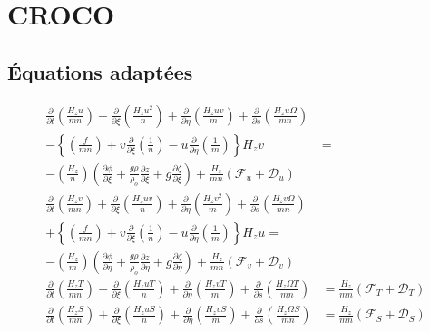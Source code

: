 \chapter{CROCO}
\section{Équations adaptées}
\label{sec:eq adapte}
\begin{subequations}
    \begin{align}
        \frac{\partial}{\partial t}\left(\frac{H_{z} u}{m n}\right)+\frac{\partial}{\partial \xi}\left(\frac{H_{z} u^{2}}{n}\right) + \frac{\partial}{\partial \eta}\left(\frac{H_{z} u v}{m}\right) + \frac{\partial}{\partial s}\left(\frac{H_{z} u \Omega}{m n}\right)  \nonumber \\
        - \left\{\left(\frac{f}{m n}\right) + v \frac{\partial}{\partial \xi}\left(\frac{1}{n}\right) - u \frac{\partial}{\partial \eta}\left(\frac{1}{m}\right)\right\} H_{z} v & = \nonumber \\
        -\left(\frac{H_{z}}{n}\right)\left(\frac{\partial \phi}{\partial \xi}+\frac{g \rho}{\rho_{o}} \frac{\partial z}{\partial \xi}+g \frac{\partial \zeta}{\partial \xi}\right)+\frac{H_{z}}{m n}\left(\mathcal{F}_{u}+\mathcal{D}_{u}\right) \\
        \frac{\partial}{\partial t}\left(\frac{H_{z} v}{m n}\right)+\frac{\partial}{\partial \xi}\left(\frac{H_{z} u v}{n}\right)+\frac{\partial}{\partial \eta}\left(\frac{H_{z} v^{2}}{m}\right)+\frac{\partial}{\partial s}\left(\frac{H_{z} v \Omega}{m n}\right)  \nonumber \\
        + \left\{\left(\frac{f}{m n}\right) + v \frac{\partial}{\partial \xi}\left(\frac{1}{n}\right) - u \frac{\partial}{\partial \eta}\left(\frac{1}{m}\right)\right\} H_{z} u = \nonumber \\
        - \left(\frac{H_{z}}{m}\right)\left(\frac{\partial \phi}{\partial \eta}+\frac{g \rho}{\rho_{o}} \frac{\partial z}{\partial \eta} + g \frac{\partial \zeta}{\partial \eta}\right)+\frac{H_{z}}{m n}\left(\mathcal{F}_{v}+\mathcal{D}_{v}\right) \\
        \frac{\partial}{\partial t}\left(\frac{H_{z} T}{m n}\right)+\frac{\partial}{\partial \xi}\left(\frac{H_{z} u T}{n}\right)+\frac{\partial}{\partial \eta}\left(\frac{H_{z} v T}{m}\right)+\frac{\partial}{\partial s}\left(\frac{H_{z} \Omega T}{m n}\right) &=\frac{H_{z}}{m n}\left(\mathcal{F}_{T}+\mathcal{D}_{T}\right) \\
        \frac{\partial}{\partial t}\left(\frac{H_{z} S}{m n}\right)+\frac{\partial}{\partial \xi}\left(\frac{H_{z} u S}{n}\right)+\frac{\partial}{\partial \eta}\left(\frac{H_{z} v S}{m}\right)+\frac{\partial}{\partial s}\left(\frac{H_{z} \Omega S}{m n}\right) &=\frac{H_{z}}{m n}\left(\mathcal{F}_{S}+\mathcal{D}_{S}\right) \\

\end{align}
\end{subequations}
